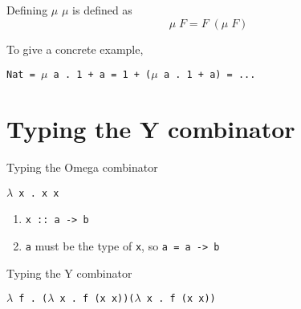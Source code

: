 \documentclass[10pt]{beamer}
\newcommand{\lam}[2]{$\lambda$ #1 . #2}
\newcommand{\yc}{\lam{f}{(\lam{x}{f (x x)})(\lam{x}{f (x x)})}}
\newcommand{\app}[2]{#1 \; #2}
\begin{document}
\begin{frame}[fragile]{Defining \textbf{$\mu$}}
  $\mu$ is defined as $$\app{\mu}{F} = \app{F}{(\app{\mu}{F})}$$

  To give a concrete example, \\
  \begin{center}
  \texttt{Nat = $\mu$ a . 1 + a = 1 + ($\mu$ a . 1 + a) = ...}
  \end{center}
\end{frame}

\section{Typing the Y combinator}

\begin{frame}[fragile]{Typing the Omega combinator}
  \begin{center}
  \texttt{\lam{x}{x x}} \\
  \end{center}
  \vspace{0.4in}
  \begin{enumerate}
    \item \texttt{x :: a -> b}
    \item \texttt{a} must be the type of \texttt{x}, so \texttt{a = a -> b}
  \end{enumerate}
\end{frame}

\begin{frame}[fragile]{Typing the Y combinator}
  \begin{center}
  \texttt{\yc} \\
  \end{center}
  \vspace{0.2in}
  \begin{enumerate}
  \end{enumerate}
\end{frame}
\end{document}
